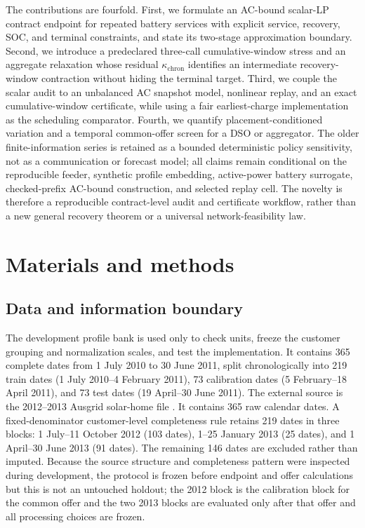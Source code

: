 \documentclass[11pt]{article}
\begin{document}
The contributions are fourfold. First, we formulate an AC-bound scalar-LP contract endpoint for repeated battery services with explicit service, recovery, SOC, and terminal constraints, and state its two-stage approximation boundary. Second, we introduce a predeclared three-call cumulative-window stress and an aggregate relaxation whose residual \(\kappa_{\mathrm{chron}}\) identifies an intermediate recovery-window contraction without hiding the terminal target. Third, we couple the scalar audit to an unbalanced AC snapshot model, nonlinear replay, and an exact cumulative-window certificate, while using a fair earliest-charge implementation as the scheduling comparator. Fourth, we quantify placement-conditioned variation and a temporal common-offer screen for a DSO or aggregator. The older finite-information series is retained as a bounded deterministic policy sensitivity, not as a communication or forecast model; all claims remain conditional on the reproducible feeder, synthetic profile embedding, active-power battery surrogate, checked-prefix AC-bound construction, and selected replay cell. The novelty is therefore a reproducible contract-level audit and certificate workflow, rather than a new general recovery theorem or a universal network-feasibility law.

\section{Materials and methods}
\subsection{Data and information boundary}
    The development profile bank is used only to check units, freeze the customer grouping and normalization scales, and test the implementation. It contains 365 complete dates from 1 July 2010 to 30 June 2011, split chronologically into 219 train dates (1 July 2010--4 February 2011), 73 calibration dates (5 February--18 April 2011), and 73 test dates (19 April--30 June 2011). The external source is the 2012--2013 Ausgrid solar-home file \cite{Ausgrid2011}. It contains 365 raw calendar dates. A fixed-denominator customer-level completeness rule retains 219 dates in three blocks: 1 July--11 October 2012 (103 dates), 1--25 January 2013 (25 dates), and 1 April--30 June 2013 (91 dates). The remaining 146 dates are excluded rather than imputed. Because the source structure and completeness pattern were inspected during development, the protocol is frozen before endpoint and offer calculations but this is not an untouched holdout; the 2012 block is the calibration block for the common offer and the two 2013 blocks are evaluated only after that offer and all processing choices are frozen.
\end{document}
